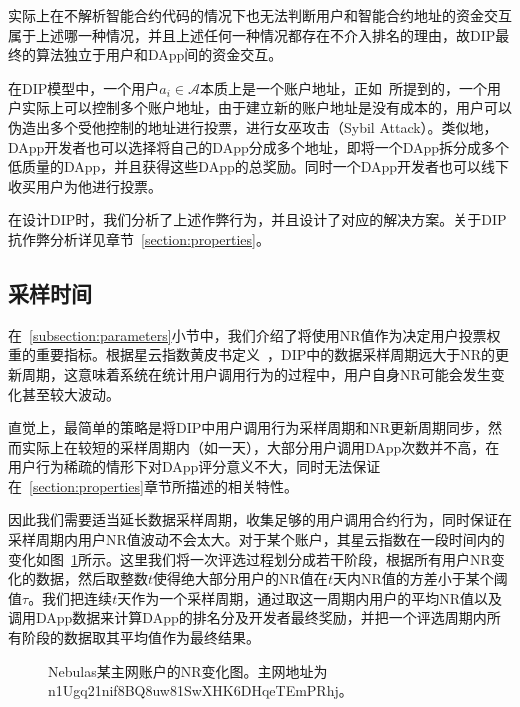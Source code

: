 实际上在不解析智能合约代码的情况下也无法判断用户和智能合约地址的资金交互属于上述哪一种情况，并且上述任何一种情况都存在不介入排名的理由，故DIP最终的算法独立于用户和DApp间的资金交互。

在DIP模型中，一个用户$a_i \in \mathcal{A}$本质上是一个账户地址，正如~\cite{Nebulasyellowpaper}所提到的，一个用户实际上可以控制多个账户地址，由于建立新的账户地址是没有成本的，用户可以伪造出多个受他控制的地址进行投票，进行女巫攻击（Sybil Attack）。类似地，DApp开发者也可以选择将自己的DApp分成多个地址，即将一个DApp拆分成多个低质量的DApp，并且获得这些DApp的总奖励。同时一个DApp开发者也可以线下收买用户为他进行投票。

在设计DIP时，我们分析了上述作弊行为，并且设计了对应的解决方案。关于DIP抗作弊分析详见章节~\ref{section:properties}。

\subsection{采样时间}
\label{subsection:interval}

在~\ref{subsection:parameters}小节中，我们介绍了将使用NR值作为决定用户投票权重的重要指标。根据星云指数黄皮书定义~\cite{Nebulasyellowpaper}，DIP中的数据采样周期远大于NR的更新周期，这意味着系统在统计用户调用行为的过程中，用户自身NR可能会发生变化甚至较大波动。

直觉上，最简单的策略是将DIP中用户调用行为采样周期和NR更新周期同步，然而实际上在较短的采样周期内（如一天），大部分用户调用DApp次数并不高，在用户行为稀疏的情形下对DApp评分意义不大，同时无法保证在~\ref{section:properties}章节所描述的相关特性。

因此我们需要适当延长数据采样周期，收集足够的用户调用合约行为，同时保证在采样周期内用户NR值波动不会太大。对于某个账户，其星云指数在一段时间内的变化如图~\ref{fig:nr}所示。这里我们将一次评选过程划分成若干阶段，根据所有用户NR变化的数据，然后取整数$t$使得绝大部分用户的NR值在$t$天内NR值的方差小于某个阈值$\tau$。我们把连续$t$天作为一个采样周期，通过取这一周期内用户的平均NR值以及调用DApp数据来计算DApp的排名分及开发者最终奖励，并把一个评选周期内所有阶段的数据取其平均值作为最终结果。%


\begin{figure}
\label{fig:nr}
  \centering
  
  \caption{Nebulas某主网账户的NR变化图。主网地址为n1Ugq21nif8BQ8uw81SwXHK6DHqeTEmPRhj。}
\end{figure}
